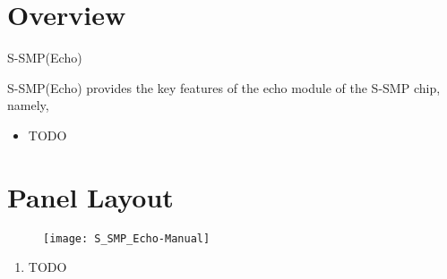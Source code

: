 \documentclass[12pt,a4paper]{article}
\begin{document}


\section{Overview}

S-SMP(Echo)

S-SMP(Echo) provides the key features of the echo module of the S-SMP chip, namely,
\begin{itemize}
  \item TODO
\end{itemize}


\clearpage
\section{Panel Layout}

\begin{figure}[!htp]
\centering
\texttt{[image: S\_SMP\_Echo-Manual]}
\end{figure}

\begin{enumerate}
  \item TODO
\end{enumerate}


\clearpage
\renewcommand\refname{References \& Acknowledgments}
\nocite{*}


\end{document}
